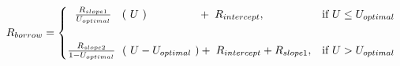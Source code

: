 \documentclass[preview]{standalone}
\begin{document}
\begin{align*}
R_{borrow} =\begin{cases} \ \ \frac{R_{slope1}}{U_{optimal}}\ \ \hspace{0.1cm} (\ U \ )\ \ \ \ \ \ \ \ \ \ \ \ \ \  + \hspace{0.1cm}R_{intercept}, & \text{if } U \leq U_{optimal} \\\\[0.3em] \frac{R_{slope2}}{1-U_{optimal}}\ \hspace{0.1cm} (\ U-U_{optimal}\ ) + \hspace{0.1cm}R_{intercept} + R_{slope1}, & \text{if } U > U_{optimal} \end{cases}
\end{align*}
\end{document}
